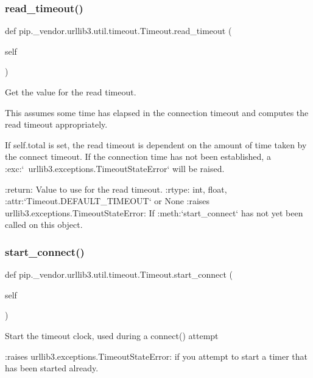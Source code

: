 \subsubsection{\texorpdfstring{read\+\_\+timeout()}{read\_timeout()}}
{\footnotesize\ttfamily def pip.\+\_\+vendor.\+urllib3.\+util.\+timeout.\+Timeout.\+read\+\_\+timeout (\begin{DoxyParamCaption}\item[{}]{self }\end{DoxyParamCaption})}

\begin{DoxyVerb}Get the value for the read timeout.

This assumes some time has elapsed in the connection timeout and
computes the read timeout appropriately.

If self.total is set, the read timeout is dependent on the amount of
time taken by the connect timeout. If the connection time has not been
established, a :exc:`~urllib3.exceptions.TimeoutStateError` will be
raised.

:return: Value to use for the read timeout.
:rtype: int, float, :attr:`Timeout.DEFAULT_TIMEOUT` or None
:raises urllib3.exceptions.TimeoutStateError: If :meth:`start_connect`
    has not yet been called on this object.
\end{DoxyVerb}
 \mbox{\label{classpip_1_1__vendor_1_1urllib3_1_1util_1_1timeout_1_1Timeout_a53b5261d7c65cda49be436bd2725d56e}} 
\subsubsection{\texorpdfstring{start\+\_\+connect()}{start\_connect()}}
{\footnotesize\ttfamily def pip.\+\_\+vendor.\+urllib3.\+util.\+timeout.\+Timeout.\+start\+\_\+connect (\begin{DoxyParamCaption}\item[{}]{self }\end{DoxyParamCaption})}

\begin{DoxyVerb}Start the timeout clock, used during a connect() attempt

:raises urllib3.exceptions.TimeoutStateError: if you attempt
    to start a timer that has been started already.
\end{DoxyVerb}
 

